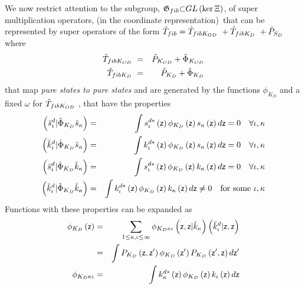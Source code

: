 We now restrict attention to the subgroup, ${\frak G}_{fib}{\frak \subset }%
GL\left( \ker \Xi \right) $, of super multiplication operators, (in the
coordinate representation){\it \ }that can be represented by super operators
of the form $\hat{T}_{fib}=\hat{T}_{fibK_{OD}{\rm \ }}+\hat{T}_{fibK_{D}{\rm %
\ }}+\hat{P}_{S_{D}}$ where 
\begin{eqnarray}
\hat{T}_{fibK_{OD}{\rm \ }} &=&\hat{P}_{K_{OD}}+\hat{\Phi}_{K_{OD}} 
\nonumber \\
\hat{T}_{fibK_{D}{\rm \ }} &=&\hat{P}_{K_{D}}+\hat{\Phi}_{K_{D}}
\end{eqnarray}%
that map {\it pure states to pure states} and are generated by the functions 
$\phi _{K_{D}}$ and a fixed $\omega $ for $\hat{T}_{fibK_{OD}{\rm \ }}$,
that have the properties 
\begin{eqnarray}
\left( \breve{s}_{i}^{d}|\hat{\Phi}_{K_{D}}\breve{s}_{\kappa }\right)
&=&\int s_{\iota }^{d\ast }\left( {\sf z}\right) \phi _{K_{D}}\left( {\sf z}%
\right) s_{\kappa }\left( {\sf z}\right) d{\sf z}=0\quad \forall \iota
,\kappa  \nonumber \\
\left( \breve{k}_{i}^{d}|\hat{\Phi}_{K_{D}}\breve{s}_{\kappa }\right)
&=&\int k_{\iota }^{d\ast }\left( {\sf z}\right) \phi _{K_{D}}\left( {\sf z}%
\right) s_{\kappa }\left( {\sf z}\right) d{\sf z}=0\quad \forall \iota
,\kappa  \nonumber \\
\left( \breve{s}_{i}^{d}|\hat{\Phi}_{K_{D}}\breve{k}_{\kappa }\right)
&=&\int s_{\iota }^{d\ast }\left( {\sf z}\right) \phi _{K_{D}}\left( {\sf z}%
\right) k_{\kappa }\left( {\sf z}\right) d{\sf z}=0\quad \forall \iota
,\kappa  \nonumber \\
\left( \breve{k}_{i}^{d}|\hat{\Phi}_{K_{D}}\breve{k}_{\kappa }\right)
&=&\int k_{\iota }^{d\ast }\left( {\sf z}\right) \phi _{K_{D}}\left( {\sf z}%
\right) k_{\kappa }\left( {\sf z}\right) d{\sf z}\neq 0\quad \text{for some }%
\iota ,\kappa  \label{phicond}
\end{eqnarray}%
Functions with these properties can be expanded as 
\begin{eqnarray}
\phi _{K_{D}}\left( {\sf z}\right) &=&\sum_{1\leq \kappa ,\iota \leq \infty
}\phi _{K_{D}\kappa \iota }\left( {\sf z},{\sf z}|\breve{k}_{\kappa }\right)
\left( \breve{k}_{\iota }^{d}|{\sf z},{\sf z}\right)  \nonumber \\
&=&\int P_{K_{D}}\left( {\sf z},{\sf z}^{\prime }\right) \phi _{K_{D}}\left( 
{\sf z}^{\prime }\right) P_{K_{D}}\left( {\sf z}^{\prime },{\sf z}\right) d%
{\sf z}^{\prime }  \nonumber \\
\phi _{K_{D}\kappa \iota } &=&\int k_{\kappa }^{d\ast }\left( {\sf z}\right)
\phi _{K_{D}}\left( {\sf z}\right) k_{\iota }\left( {\sf z}\right) d{\sf z}
\label{PhiKD}
\end{eqnarray}%
